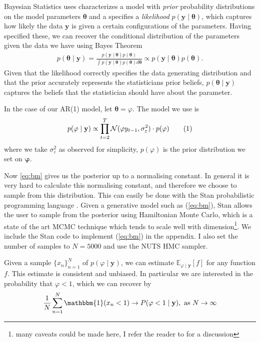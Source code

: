 \documentclass{article}
\theoremstyle{definition}
\theoremstyle{exercise}
\theoremstyle{remark}
\newcommand\nt{\addtocounter{equation}{1}\tag{\theequation}}
\begin{document}
Bayesian Statistics uses characterizes a model with \emph{prior} probability distributions on the model parameters $\bm{\theta}$ and a specifies a \emph{likelihood} $p(\mathbf{y} \;|\; \bm{\theta})$, which captures how likely the data $\mathbf{\bm{y}}$ is given a certain configurations of the parameters. Having specified these, we can recover the conditional distribution of the parameters given the data we have using Bayes Theorem
\begin{align*}
    p(\bm{\theta} \;|\; \mathbf{y}) = \frac{p(\mathbf{y} \;|\; \bm{\theta})  p(\bm{\theta})}{\int_{}^{}  p(\mathbf{y} \;|\; \bm{\theta})  p(\bm{\theta}) d\bm{\theta}} \propto p(\mathbf{y} \;|\; \bm{\theta})  p(\bm{\theta}).
\end{align*}
Given that the likelihood correctly specifies the data generating distribution and that the prior accurately represents the statisticians prior beliefs, $p(\bm{\theta} \;|\; \mathbf{y})$ captures the beliefs that the statistician should have about the parameter.

In the case of our AR(1) model, let $\bm{\theta} = \varphi$. The model we use is
\begin{align*}
    p(\varphi \;|\; \mathbf{y}) \propto \prod_{t=2}^{T} \mathcal{N}(\varphi y_{t-1}, \sigma^2_{\varepsilon}) \cdot p(\varphi) \nt \label{eq:bm}
\end{align*}
where we take $\sigma^2_{\varepsilon}$ as observed for simplicity, $p(\varphi)$ is the prior distribution we set on $\bm{\varphi}$.

Now \autoref{eq:bm} gives us the posterior up to a normalising constant. In general it is very hard to calculate this normalising constant, and therefore we choose to sample from this distribution. This can easily be done with the Stan probabilistic programming language \citep{bleepbleep}. Given a generative model such as (\ref{eq:bm}), Stan allows the user to sample from the posterior using Hamiltonian Monte Carlo, %
which is a state of the art MCMC technique which tends to scale well with dimension\footnote{many caveats could be made here, I refer the reader to \cite{betancourt2017conceptual} for a discussion}.
We include the Stan code to implement (\ref{eq:bm}) in the appendix. I also set the number of samples to $N=5000$ and use the NUTS HMC sampler.

Given a sample $\{x_n\}_{n=1}^{N}$ of $p(\varphi \;|\; \mathbf{y})$, we can estimate
\(
    \mathbb{E}_{\varphi \;|\; \mathbf{y}}\left[f\right]
    \)
for any function $f$. This estimate is consistent and unbiased.
In particular we are interested in the probability that $\varphi < 1$, which we can recover by
\begin{align*}
    \frac{1}{N}\sum_{n=1}^{N} \mathbbm{1}(x_n < 1)  \to P(\varphi < 1 \;|\; \mathbf{y}), \text{ as } N \to \infty
\end{align*}
\end{document}
